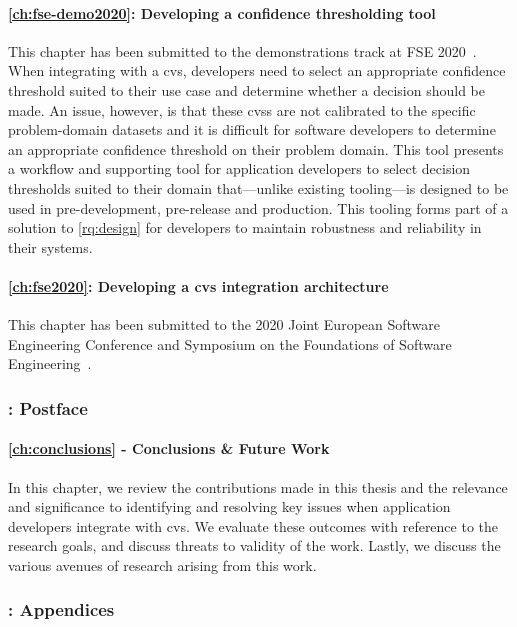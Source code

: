 \paragraph{\cref{ch:fse-demo2020}: Developing a confidence thresholding tool} This chapter has been submitted to the demonstrations track at FSE 2020~\citep{Cummaudo:2020fse-demo}. When integrating with a \gls{cvs}, developers need to select an appropriate confidence threshold suited to their use case and determine whether a decision should be made. An issue, however, is that these \glspl{cvs} are not calibrated to the specific problem-domain datasets and it is difficult for software developers to determine an appropriate confidence threshold on their problem domain. This tool presents a workflow and supporting tool for application developers to select decision thresholds suited to their domain that---unlike existing tooling---is designed to be used in pre-development, pre-release and production. This tooling forms part of a solution to \ref{rq:design} for developers to maintain robustness and reliability in their systems.

\paragraph{\cref{ch:fse2020}: Developing a \gls{cvs} integration architecture} This chapter has been submitted to the 2020 Joint European Software Engineering Conference and Symposium on the Foundations of Software Engineering~\citep{Cummaudo:2020fse}. 

\subsubsection{: Postface}

\paragraph{\cref{ch:conclusions} - Conclusions \& Future Work} In this chapter, we review the contributions made in this thesis and the relevance and significance to identifying and resolving key issues when application developers integrate with \gls{cvs}. We evaluate these outcomes with reference to the research goals, and discuss threats to validity of the work. Lastly, we discuss the various avenues of research arising from this work.

\subsubsection{: Appendices}

